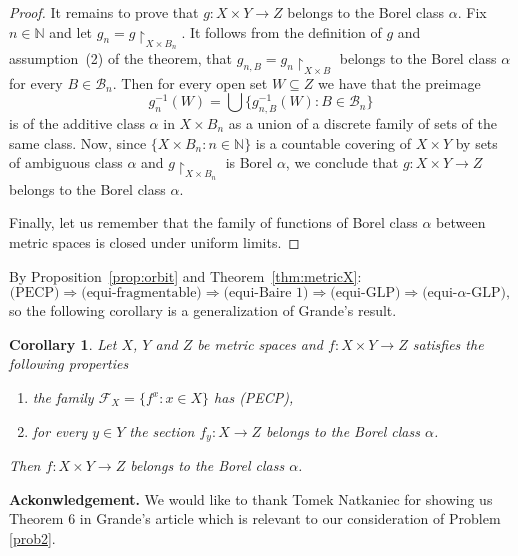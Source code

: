 \documentclass[a4paper]{amsart}
\theoremstyle{plain}
\newtheorem{corollary}[theorem]{Corollary}
\theoremstyle{definition}
\theoremstyle{remark}
\numberwithin{equation}{section}
\begin{document}
\begin{proof}
It remains to prove that $g\colon X\times Y\to Z$ belongs to the Borel class $\alpha$. Fix $n\in\mathbb N$ and let 
$g_n=g\restriction_{X\times B_n}$. It follows from the definition of $g$ and assumption~(2) of the theorem, that $g_{n,B}=g_n\restriction_{X\times B}$ belongs to the Borel class $\alpha$ for every $B\in\mathcal B_n$. Then for every open set $W\subseteq Z$ we have that the preimage
$$
g_n^{-1}(W)=\bigcup\{g_{n,B}^{-1}(W):B\in\mathcal B_n\}
$$
is of the additive class $\alpha$ in $X\times B_n$ as a union of a discrete family of sets of the same class. Now, since $\{X\times B_n:n\in\mathbb N\}$ is a countable covering of $X\times Y$ by sets of ambiguous class $\alpha$ and $g\restriction_{X\times B_n}$ is Borel $\alpha$, we conclude that $g\colon X\times Y\to Z$ belongs to the Borel class $\alpha$.

	Finally, let us remember that the family of functions of Borel class $\alpha$ between metric spaces is closed under uniform limits.	 
\end{proof}

By Proposition~\ref{prop:orbit} and Theorem~\ref{thm:metricX}:
$$\textrm{(PECP)} \Rightarrow \textrm{(equi-fragmentable)} \Rightarrow \textrm{(equi-Baire 1)} \Rightarrow \textrm{(equi-GLP)} \Rightarrow \textrm{(equi-$\alpha$-GLP)},$$
so the following corollary is a generalization of Grande's result. 

  \begin{corollary}
  	Let $X$, $Y$ and $Z$ be metric spaces and $f\colon X\times Y\to Z$ satisfies the following properties
  	\begin{enumerate}
  		\item the family $\mathscr F_X=\{f^x: x\in X\}$ has (PECP),
  		
  		\item for every $y\in Y$ the section $f_y\colon X\to Z$ belongs to the Borel class $\alpha$. 
  	\end{enumerate}
  	
  	Then $f\colon X\times Y\to Z$ belongs to the Borel class $\alpha$.
  \end{corollary}

  \noindent
  {\bf Ackonwledgement.} We would like to thank Tomek Natkaniec for showing us Theorem 6 in Grande's article \cite{Gr} which is relevant to our consideration of Problem \ref{prob2}.





\end{document}
